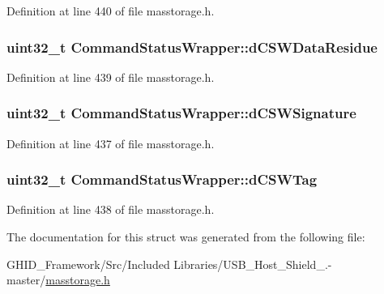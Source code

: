 \-Definition at line 440 of file masstorage.\-h.

\hypertarget{struct_command_status_wrapper_adf944665d28bb394a3d9756e8418d09e}{
\subsubsection[{d\-C\-S\-W\-Data\-Residue}]{\setlength{\rightskip}{0pt plus 5cm}uint32\-\_\-t {\bf \-Command\-Status\-Wrapper\-::d\-C\-S\-W\-Data\-Residue}}}\label{struct_command_status_wrapper_adf944665d28bb394a3d9756e8418d09e}


\-Definition at line 439 of file masstorage.\-h.

\hypertarget{struct_command_status_wrapper_a498a87759e737395829b6ff4b6420ad1}{
\subsubsection[{d\-C\-S\-W\-Signature}]{\setlength{\rightskip}{0pt plus 5cm}uint32\-\_\-t {\bf \-Command\-Status\-Wrapper\-::d\-C\-S\-W\-Signature}}}\label{struct_command_status_wrapper_a498a87759e737395829b6ff4b6420ad1}


\-Definition at line 437 of file masstorage.\-h.

\hypertarget{struct_command_status_wrapper_af872c29cfee3fb74e7ad9471ee4461fb}{
\subsubsection[{d\-C\-S\-W\-Tag}]{\setlength{\rightskip}{0pt plus 5cm}uint32\-\_\-t {\bf \-Command\-Status\-Wrapper\-::d\-C\-S\-W\-Tag}}}\label{struct_command_status_wrapper_af872c29cfee3fb74e7ad9471ee4461fb}


\-Definition at line 438 of file masstorage.\-h.



\-The documentation for this struct was generated from the following file\-:\begin{DoxyCompactItemize}
\item 
\-G\-H\-I\-D\-\_\-\-Framework/\-Src/\-Included Libraries/\-U\-S\-B\-\_\-\-Host\-\_\-\-Shield\-\_.-\/master/\hyperlink{masstorage_8h}{masstorage.\-h}\end{DoxyCompactItemize}
